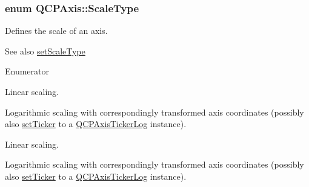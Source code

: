\subsubsection[{\texorpdfstring{Scale\+Type}{ScaleType}}]{\setlength{\rightskip}{0pt plus 5cm}enum {\bf Q\+C\+P\+Axis\+::\+Scale\+Type}}\hypertarget{class_q_c_p_axis_a36d8e8658dbaa179bf2aeb973db2d6f0}{}\label{class_q_c_p_axis_a36d8e8658dbaa179bf2aeb973db2d6f0}
Defines the scale of an axis. \begin{DoxySeeAlso}{See also}
\hyperlink{class_q_c_p_axis_adef29cae617af4f519f6c40d1a866ca6}{set\+Scale\+Type} 
\end{DoxySeeAlso}
\begin{Desc}
\item[Enumerator]\par
\begin{description}
\item[{\em 
st\+Linear\hypertarget{class_q_c_p_axis_a36d8e8658dbaa179bf2aeb973db2d6f0ac2a013f86793dd3cd879bae4c4a3a29d}{}\label{class_q_c_p_axis_a36d8e8658dbaa179bf2aeb973db2d6f0ac2a013f86793dd3cd879bae4c4a3a29d}
}]Linear scaling. \item[{\em 
st\+Logarithmic\hypertarget{class_q_c_p_axis_a36d8e8658dbaa179bf2aeb973db2d6f0af4ca9655d4e466545bc14bddb8663c8e}{}\label{class_q_c_p_axis_a36d8e8658dbaa179bf2aeb973db2d6f0af4ca9655d4e466545bc14bddb8663c8e}
}]Logarithmic scaling with correspondingly transformed axis coordinates (possibly also \hyperlink{class_q_c_p_axis_a4ee03fcd2c74d05cd1a419b9af5cfbdc}{set\+Ticker} to a \hyperlink{class_q_c_p_axis_ticker_log}{Q\+C\+P\+Axis\+Ticker\+Log} instance). \item[{\em 
st\+Linear\hypertarget{class_q_c_p_axis_a36d8e8658dbaa179bf2aeb973db2d6f0ac2a013f86793dd3cd879bae4c4a3a29d}{}\label{class_q_c_p_axis_a36d8e8658dbaa179bf2aeb973db2d6f0ac2a013f86793dd3cd879bae4c4a3a29d}
}]Linear scaling. \item[{\em 
st\+Logarithmic\hypertarget{class_q_c_p_axis_a36d8e8658dbaa179bf2aeb973db2d6f0af4ca9655d4e466545bc14bddb8663c8e}{}\label{class_q_c_p_axis_a36d8e8658dbaa179bf2aeb973db2d6f0af4ca9655d4e466545bc14bddb8663c8e}
}]Logarithmic scaling with correspondingly transformed axis coordinates (possibly also \hyperlink{class_q_c_p_axis_a4ee03fcd2c74d05cd1a419b9af5cfbdc}{set\+Ticker} to a \hyperlink{class_q_c_p_axis_ticker_log}{Q\+C\+P\+Axis\+Ticker\+Log} instance). \end{description}
\end{Desc}
